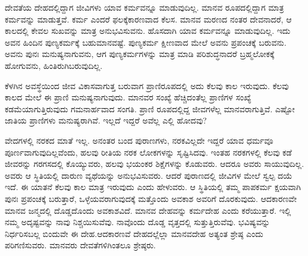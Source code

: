 ದೇವತೆಯ ದೇಹದಲ್ಲಿದ್ದಾಗ ಜೀವಿಗಳು ಯಾವ ಕರ್ಮವನ್ನೂ ಮಾಡುವುದಿಲ್ಲ. ಮಾನವ ರೂಪದಲ್ಲಿದ್ದಾಗ ಮಾತ್ರ ಕರ್ಮವನ್ನು ಮಾಡುತ್ತವೆ. ಕರ್ಮ ಎಂದರೆ ಫಲಕ್ಕೆ\break ಕಾರಣವಾದ ಕೆಲಸ. ಮಾನವ ಮರಣದ ನಂತರ ದೇವನಾದರೆ, ಆ ಕಾಲದಲ್ಲಿ ಕೇವಲ ಸುಖವನ್ನು ಮಾತ್ರ ಅನುಭವಿಸುವನು. ಹೊಸದಾಗಿ ಯಾವ ಕರ್ಮವನ್ನೂ ಮಾಡುವುದಿಲ್ಲ. ಇದು ಅವನ ಹಿಂದಿನ ಪುಣ್ಯಕರ್ಮಕ್ಕೆ ಬಹುಮಾನವಷ್ಟೆ. ಪುಣ್ಯಕರ್ಮ ಕ್ಷೀಣವಾದ ಮೇಲೆ ಅವನು ಪ್ರಪಂಚಕ್ಕೆ ಬರುವನು. ಅವನು ಪುನಃ ಮನುಷ್ಯನಾಗುವನು, ಆಗ ಪುಣ್ಯಕರ್ಮಗಳನ್ನು ಮಾತ್ರ ಮಾಡಿ ಪರಿಶುದ್ಧನಾದರೆ ಬ್ರಹ್ಮಲೋಕಕ್ಕೆ ಹೋಗುವನು, ಹಿಂತಿರುಗಿ\break ಬರುವುದಿಲ್ಲ.

ಕೆಳಗಿನ ಅವಸ್ಥೆಯಿಂದ ಜೀವ ವಿಕಾಸವಾಗುತ್ತ ಬರುವಾಗ ಪ್ರಾಣಿರೂಪದಲ್ಲಿ ಅದು ಕೆಲವು ಕಾಲ ಇರುವುದು. ಕೆಲವು ಕಾಲದ ಮೇಲೆ ಈ ಪ್ರಾಣಿ ಮನುಷ್ಯನಾಗುವುದು. ಮಾನವರ ಸಂಖ್ಯೆ ಹೆಚ್ಚಿದಂತೆಲ್ಲ ಪ್ರಾಣಿಗಳ ಸಂಖ್ಯೆ ಕಡಮೆಯಾಗುತ್ತಿರುವುದು ಗಮನಾರ್ಹವಾದ ಸಂಗತಿ. ಪ್ರಾಣಿ ರೂಪದಲ್ಲಿದ್ದ ಜೀವಗಳೆಲ್ಲ ಮಾನವರಾಗುತ್ತಿವೆ. ಎಷ್ಟೋ ಜಾತಿಯ ಪ್ರಾಣಿಗಳು ಮನುಷ್ಯರಾಗಿವೆ. ಇಲ್ಲದೆ ಇದ್ದರೆ ಅವೆಲ್ಲ ಎಲ್ಲಿ ಹೋದವು?

ವೇದಗಳಲ್ಲಿ ನರಕದ ಮಾತೆ ಇಲ್ಲ. ಅನಂತರ ಬಂದ ಪುರಾಣಗಳು, ನರಕವಿಲ್ಲದೇ ಇದ್ದರೆ ಯಾವ ಧರ್ಮವೂ ಪೂರ್ಣವಾಗುವುದಿಲ್ಲವೆಂದು, ಹಲವು ರೀತಿಯ ನರಕ ಲೋಕಗಳನ್ನು ಸೃಷ್ಟಿಸಿದವು. ಇಂತಹ ನರಕಗಳಲ್ಲಿ ಕೆಲವು ಕಡೆ ಜೀವರನ್ನು ಗರಗಸದಲ್ಲಿ ಕೊಯ್ಯುವರು, ಹಲವು ಭಯಂಕರ ಶಿಕ್ಷೆಗಳನ್ನು ಕೊಡುವರು. ಆದರೂ ಅವರು ಸಾಯುವುದಿಲ್ಲ. ಅವರು ಆ ಸ್ಥಿತಿಯಲ್ಲಿ ದಾರುಣ ವ್ಯಥೆಯನ್ನು ಅನುಭವಿಸುವರು. ಆದರೆ ಪುರಾಣದಲ್ಲಿ ಜೀವಿಗಳ ಮೇಲೆ ಸ್ವಲ್ಪ ದಯೆ ಇದೆ. ಈ ಯಾತನೆ ಕೆಲವು ಕಾಲ ಮಾತ್ರ ಇರುವುದು ಎಂದು ಹೇಳುವರು. ಆ ಸ್ಥಿತಿಯಲ್ಲಿ ತಮ್ಮ ಪಾಪಕರ್ಮ ಕ್ಷಯವಾಗಿ ಪುನಃ ಪ್ರಪಂಚಕ್ಕೆ ಬರುತ್ತಾರೆ, ಒಳ್ಳೆಯವರಾಗುವುದಕ್ಕೆ ಮತ್ತೊಂದು ಅವಕಾಶ ಅವರಿಗೆ ದೊರಕುವುದು. ಆದಕಾರಣವೇ ಮಾನವ ಜನ್ಮದಲ್ಲಿ ದೊಡ್ಡದೊಂದು ಅವಕಾಶವಿದೆ. ಮಾನವ ದೇಹವನ್ನು ಕರ್ಮದೇಹ ಎಂದು ಕರೆಯುತ್ತಾರೆ. ಇಲ್ಲಿ ನಮ್ಮ ಅದೃಷ್ಟವನ್ನು ನಾವು ನಿಶ್ಚಯಿಸುವೆವು. ನಾವೊಂದು ದೊಡ್ಡ ವೃತ್ತದಲ್ಲಿ ಸುತ್ತುತ್ತಿರುವೆವು. ಭವಿಷ್ಯವನ್ನು ನಿರ್ಧರಿಸಬಲ್ಲ ಬಿಂದುವೇ ಈ ದೇಹ.\break ಆದಕಾರಣವೆ ದೇಹದಲ್ಲೆಲ್ಲಾ ಮಾನವದೇಹ ಅತ್ಯಂತ ಶ್ರೇಷ್ಠ ಎಂದು ಪರಿಗಣಿಸುವರು. ಮಾನವರು ದೇವತೆಗಳಿಗಿಂತಲೂ ಶ್ರೇಷ್ಠರು.

